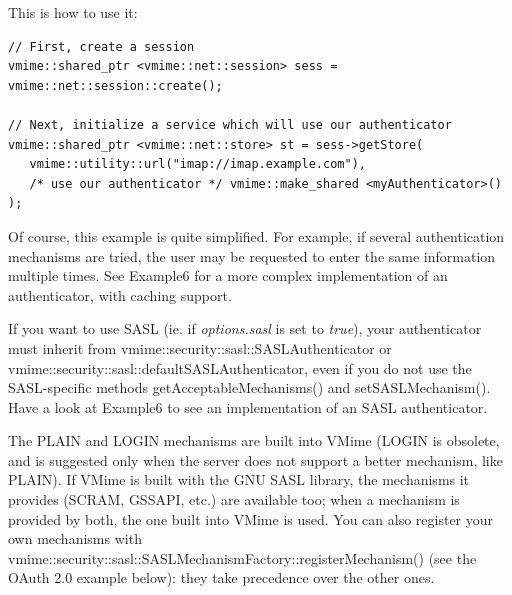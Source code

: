 This is how to use it:

\begin{lstlisting}
// First, create a session
vmime::shared_ptr <vmime::net::session> sess = vmime::net::session::create();

// Next, initialize a service which will use our authenticator
vmime::shared_ptr <vmime::net::store> st = sess->getStore(
   vmime::utility::url("imap://imap.example.com"),
   /* use our authenticator */ vmime::make_shared <myAuthenticator>()
);
\end{lstlisting}


Of course, this example is quite simplified. For example, if several
authentication mechanisms are tried, the user may be requested to enter the
same information multiple times. See  {\vexample Example6} for a more complex
implementation of an authenticator, with caching support.

If you want to use SASL (ie. if \emph{options.sasl} is set to \emph{true}),
your authenticator must inherit from
{\vcode vmime::security::sasl::SASLAuthenticator} or
{\vcode vmime::security::sasl::defaultSASLAuthenticator}, even if you do not
use the SASL-specific methods {\vcode getAcceptableMechanisms()} and
{\vcode setSASLMechanism()}. Have a look at {\vexample Example6} to see an
implementation of an SASL authenticator.

The PLAIN and LOGIN mechanisms are built into VMime (LOGIN is obsolete, and
is suggested only when the server does not support a better mechanism, like
PLAIN). If VMime is built with the GNU SASL
library, the mechanisms it provides (SCRAM, GSSAPI, etc.) are available too;
when a mechanism is provided by both, the one built into VMime is used. You
can also register your own mechanisms with
{\vcode vmime::security::sasl::SASLMechanismFactory::registerMechanism()}
(see the OAuth 2.0 example below): they take precedence over the other ones.

